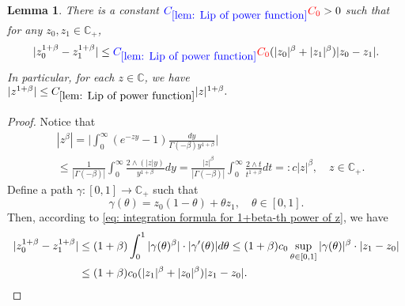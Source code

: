 \documentclass[12pt,oneside,english]{amsart}
\theoremstyle{plain}
\newtheorem{lem}[thm]{Lemma}
\theoremstyle{definition}
\numberwithin{equation}{section}
\newcommand{\added}[1]{{\color{blue}#1}}\newcommand{\deleted}[1]{{\color{red}#1}}
\begin{document}
\begin{lem}
\label{lem: Lip of power function}
    There is a constant $\added{ C_{\ref{lem: Lip of power function}} } \deleted{ C_0} > 0$ such that for any $z_0,z_1 \in \mathbb C_+$,
\begin{equation}
\label{eq: Lip of power function}
    |z_0^{1+\beta} - z_1^{1+\beta}|
    \leq \added{ C_{\ref{lem: Lip of power function}} }\deleted{ C_0}(|z_0|^{\beta}+|z_1|^{\beta})|z_0 - z_1|.
\end{equation}
\added{
    In particular, for each $z\in \mathbb C$, we have
$
    |z^{1+\beta}|
    \leq  C_{\ref{lem: Lip of power function}} |z|^{1+\beta}.
$
}
\end{lem}
\begin{proof}
    Notice that
\begin{align}
\label{eq: upper bound for beta power of z}
    &|z^{\beta}|
    = \Big|\int_0^\infty (e^{-zy}-1) \frac{dy}{\Gamma(-\beta)y^{1+\beta}}\Big|
    \\&\leq \frac{1}{|\Gamma(-\beta)|}\int_0^\infty \frac{2\wedge (|z|y)}{y^{1+\beta}}dy
    = \frac{|z|^{\beta}}{|\Gamma(-\beta)|}\int_0^\infty \frac{2\wedge t}{t^{1+\beta}}dt =: c |z|^{\beta},
    \quad z\in \mathbb C_+.
\end{align}
    Define a path $\gamma: [0,1] \to \mathbb C_+$ such that
\[
    \gamma(\theta)
    = z_0 (1-\theta) + \theta z_1,
    \quad \theta \in [0,1].
\]
    Then, according to \eqref{eq: integration formula for 1+beta-th power of z}, we have
\begin{align}
    |z_0^{1+\beta} - z_1^{1+\beta}|
    &\leq (1+\beta) \int_0^1 |\gamma(\theta)^{\beta}|\cdot |\gamma'(\theta)|d\theta
    \leq (1+\beta) c_0 \sup_{\theta \in [0,1]} |\gamma(\theta)|^{\beta} \cdot |z_1-z_0|
    \\&\leq (1+\beta) c_0 ( |z_1|^{\beta}+|z_0|^{\beta} ) |z_1-z_0|.
    \qedhere
\end{align}
\end{proof}
\end{document}

